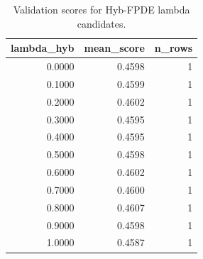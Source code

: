 \begin{table}[t]
\caption{Validation scores for Hyb-FPDE lambda candidates.}
\label{tab:lambda_distribution_computed}
\centering
\begin{tabular}{rrr}
\toprule
lambda\_hyb & mean\_score & n\_rows \\
\midrule
0.0000 & 0.4598 & 1 \\
0.1000 & 0.4599 & 1 \\
0.2000 & 0.4602 & 1 \\
0.3000 & 0.4595 & 1 \\
0.4000 & 0.4595 & 1 \\
0.5000 & 0.4598 & 1 \\
0.6000 & 0.4602 & 1 \\
0.7000 & 0.4600 & 1 \\
0.8000 & 0.4607 & 1 \\
0.9000 & 0.4598 & 1 \\
1.0000 & 0.4587 & 1 \\
\bottomrule
\end{tabular}

\end{table}

